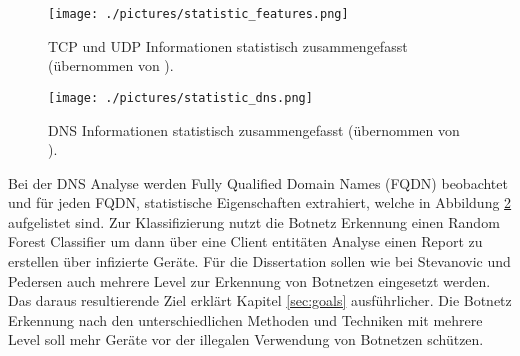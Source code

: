 \begin{figure}[h!]
    \centering
    \texttt{[image: ./pictures/statistic\_features.png]}
    \caption{TCP und UDP Informationen statistisch zusammengefasst (übernommen von \cite{DBLP:journals/ijcysa/StevanovicP16}).}
    \label{fig:stats_features}
\end{figure}

\begin{figure}[h!]
    \centering
    \texttt{[image: ./pictures/statistic\_dns.png]}
    \caption{DNS Informationen statistisch zusammengefasst (übernommen von \cite{DBLP:journals/ijcysa/StevanovicP16}).}
    \label{fig:stats_dns}
\end{figure}

Bei der DNS Analyse werden Fully Qualified Domain Names (FQDN) beobachtet und für jeden FQDN, statistische Eigenschaften extrahiert, welche in Abbildung \ref{fig:stats_dns} aufgelistet sind. Zur 
Klassifizierung nutzt die Botnetz Erkennung einen Random Forest Classifier um dann über eine Client entitäten Analyse einen Report zu erstellen über infizierte Geräte. Für die Dissertation sollen 
wie bei Stevanovic und Pedersen auch mehrere Level zur Erkennung von Botnetzen eingesetzt werden. Das daraus resultierende Ziel erklärt Kapitel \ref{sec:goals} ausführlicher.
Die Botnetz Erkennung nach den unterschiedlichen Methoden und Techniken mit mehrere Level soll mehr Geräte vor der illegalen Verwendung von Botnetzen schützen. 


